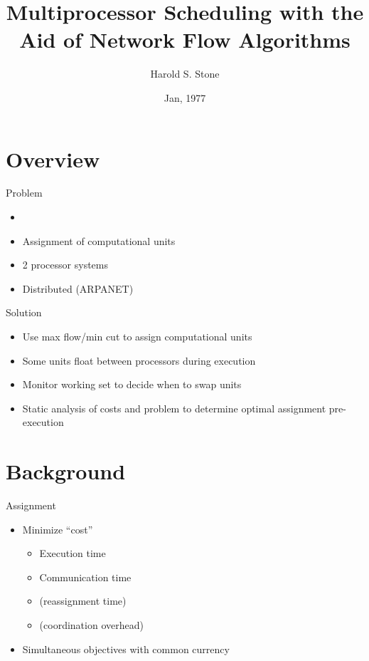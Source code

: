 \documentclass{beamer}
\title{Multiprocessor Scheduling with the Aid of Network Flow Algorithms}
\author{Harold S. Stone}
\institute{Member, IEEE}
\date{Jan, 1977}
\begin{document}
\begin{frame}
\titlepage
\end{frame}

\section{Overview}

\begin{frame}{Problem}
\begin{itemize}
	\item \cite{sto77}
	\item Assignment of computational units
	\item 2 processor systems
	\item Distributed (ARPANET)
\end{itemize}
\end{frame}

\begin{frame}{Solution}
\begin{itemize}
	\item Use max flow/min cut to assign computational units
	\item Some units float between processors during execution
	\item Monitor working set to decide when to swap units
	\item Static analysis of costs and problem to determine optimal assignment pre-execution
\end{itemize}
\end{frame}

\section{Background}

\begin{frame}{Assignment}
\begin{itemize}
	\item Minimize ``cost''
	\begin{itemize}
		\item Execution time
		\item Communication time
		\item (reassignment time)
		\item (coordination overhead)
	\end{itemize}
	\item Simultaneous objectives with common currency
\end{itemize}
\end{frame}
\end{document}
